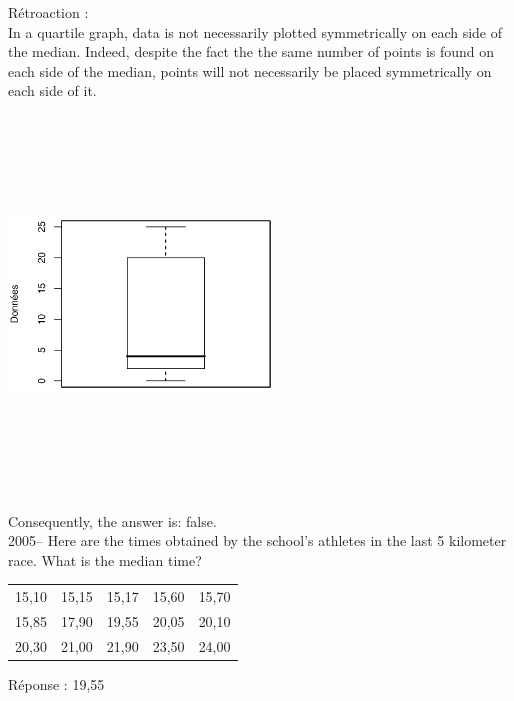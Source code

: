 \documentclass[letterpaper, 12pt]{article}
\begin{document}
R\'etroaction :\\
In a quartile graph, data is not necessarily plotted symmetrically on each side of the median. Indeed, despite the fact the the same number of points is found on each side of the median, points will not necessarily be placed symmetrically on each side of it.
\begin{center}
 \includegraphics[width=7cm,height=10cm,angle=-90]{G2004.eps}
\end{center}
Consequently, the answer is: false.\\

2005-- Here are the times obtained by the school's athletes in the last 5 kilometer race. What is the median time?\\
\begin{center}

\begin{tabular}{|c  c  c  c  c|} \hline

15,10 & 15,15 & 15,17 & 15,60 & 15,70 \\
15,85 & 17,90 & 19,55 & 20,05 & 20,10 \\
20,30 & 21,00 & 21,90 & 23,50 & 24,00 \\ \hline

\end{tabular}
\end{center}

R\'eponse : 19,55\\
\end{document}
